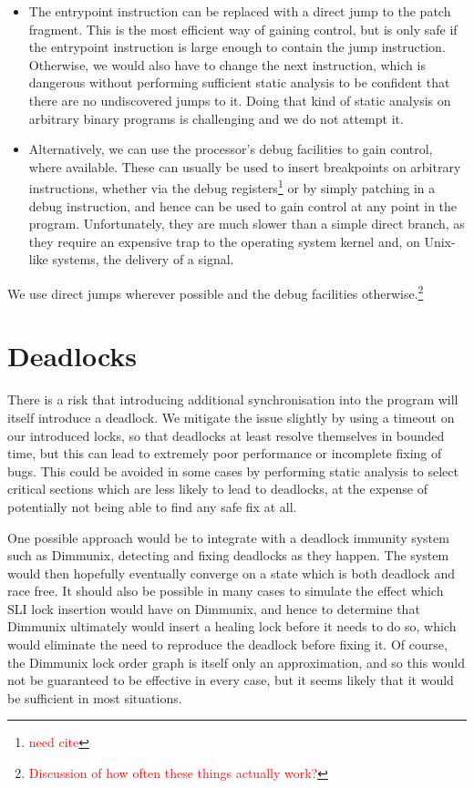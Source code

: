 \documentclass[10pt,twocolumn,preprint,natbib,authoryear]{sigplanconf}
\newcommand{\editorial}[1]{\textcolor{red}{\footnote{\textcolor{red}{#1}}}}
\newcommand{\needCite}{\editorial{need cite}}
\begin{document}
\begin{itemize}
\item The entrypoint instruction can be replaced with a direct jump to
  the patch fragment.  This is the most efficient way of gaining
  control, but is only safe if the entrypoint instruction is large
  enough to contain the jump instruction.  Otherwise, we would also
  have to change the next instruction, which is dangerous without
  performing sufficient static analysis to be confident that there are
  no undiscovered jumps to it.  Doing that kind of static analysis on
  arbitrary binary programs is challenging and we do not attempt it.

\item Alternatively, we can use the processor's debug facilities to
  gain control, where available.  These can usually be used to insert
  breakpoints on arbitrary instructions, whether via the debug
  registers\needCite{} or by simply patching in a debug instruction,
  and hence can be used to gain control at any point in the program.
  Unfortunately, they are much slower than a simple direct branch, as
  they require an expensive trap to the operating system kernel and,
  on Unix-like systems, the delivery of a signal.
\end{itemize}

We use direct jumps wherever possible and the debug facilities
otherwise.\editorial{Discussion of how often these things actually
  work?}

\section{Deadlocks}
\label{sect:deadlocks}

There is a risk that introducing additional synchronisation into the
program will itself introduce a deadlock.  We mitigate the issue
slightly by using a timeout on our introduced locks, so that deadlocks
at least resolve themselves in bounded time, but this can lead to
extremely poor performance or incomplete fixing of bugs.  This could
be avoided in some cases by performing static analysis to select
critical sections which are less likely to lead to deadlocks, at the
expense of potentially not being able to find any safe fix at all.

One possible approach would be to integrate with a deadlock immunity
system such as Dimmunix\cite{Jula2008}, detecting and fixing deadlocks
as they happen.  The system would then hopefully eventually converge
on a state which is both deadlock and race free.  It should also be
possible in many cases to simulate the effect which SLI lock insertion
would have on Dimmunix, and hence to determine that Dimmunix
ultimately would insert a healing lock before it needs to do so, which
would eliminate the need to reproduce the deadlock before fixing it.
Of course, the Dimmunix lock order graph is itself only an
approximation, and so this would not be guaranteed to be effective in
every case, but it seems likely that it would be sufficient in most
situations.
\end{document}
